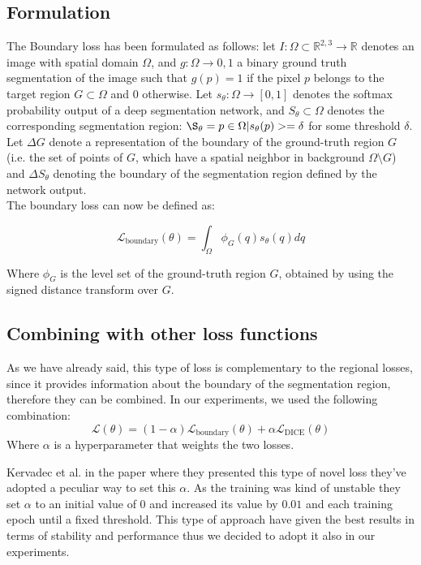\subsection{Formulation}
The Boundary loss has been formulated as follows: let $I: \Omega \subset
\mathbb{R}^{2,3} \rightarrow \mathbb{R}$ denotes an image with spatial domain
$\Omega$, and $g: \Omega \rightarrow {0,1}$ a binary ground truth segmentation
of the image such that $g(p) = 1$ if the pixel $p$ belongs to the target region
$G \subset \Omega$ and $0$ otherwise. Let $s_\theta : \Omega \rightarrow [0,1]$
denotes the softmax probability output of a deep segmentation network, and
$S_\theta \subset \Omega$ denotes the corresponding segmentation region:
$\S_\theta = {p \in \Omega | s_\theta(p) >= \delta}$ for some threshold
$\delta$. Let $\Delta G$ denote a representation of the boundary of the
ground-truth region $G$ (i.e. the set of points of $G$, which have a spatial
neighbor in background $\Omega \setminus G$) and $\Delta S_\theta$ denoting the
boundary of the segmentation region defined by the network output.\\
The boundary loss can now be defined as:

\begin{equation}
  \label{eq:boundaryloss}
  \mathcal{L}_{\text{boundary}}(\theta) = \int_{\Omega} \phi_G(q)s_\theta(q)dq
\end{equation}

Where $\phi_G$ is the level set of the ground-truth region $G$, obtained by
using the signed distance transform over $G$.

\subsection{Combining with other loss functions}
As we have already said, this type of loss is complementary to the regional
losses, since it provides information about the boundary of the segmentation
region, therefore they can be combined. In our experiments, we used the
following combination:
\begin{equation}
  \label{eq:boundaryloss}
  \mathcal{L}(\theta) = (1-\alpha)\mathcal{L}_{\text{boundary}}(\theta) +
  \alpha\mathcal{L}_{\text{DICE}}(\theta)
\end{equation}
Where $\alpha$ is a hyperparameter that weights the two losses.

Kervadec et al. \cite{kervadec2019boundary} in the paper where they presented
this type of novel loss they've adopted a peculiar way to set this $\alpha$. As
the training was kind of unstable they set $\alpha$ to an initial value of $0$
and increased its value by $0.01$ and each training epoch until a fixed
threshold. This type of approach have given the best results in terms of
stability and performance thus we decided to adopt it also in our experiments.


